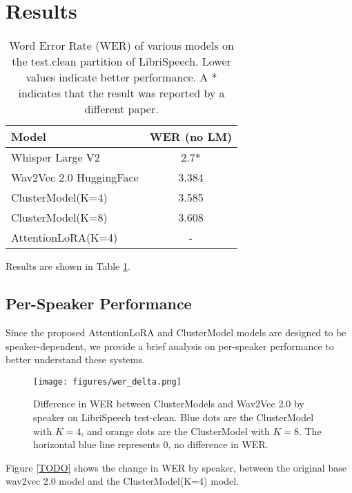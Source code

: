 \section{Results}

\begin{table}[htbp]
  \centering
  \begin{tabular}{lc}
    \toprule
    \textbf{Model} &WER (no LM)\\
    \midrule
    Whisper Large V2 \cite{whisperv2} &2.7* \\
    \midrule
    Wav2Vec 2.0 \cite{wav2vec2} HuggingFace &3.384 \\
    ClusterModel(K=4) & 3.585 \\
    ClusterModel(K=8) & 3.608 \\
    AttentionLoRA(K=4) & - \\
    \bottomrule
  \end{tabular}
  \caption{Word Error Rate (WER) of various models on the test.clean partition of LibriSpeech. Lower values indicate better performance. A * indicates that the result was reported by a different paper.}
  \label{tab:video_descriptor_comparison}
\end{table}

Results are shown in Table \ref{tab:video_descriptor_comparison}.

\subsection{Per-Speaker Performance}

Since the proposed AttentionLoRA and ClusterModel models are designed to be speaker-dependent,
we provide a brief analysis on per-speaker performance to better understand these systems.

\begin{figure}[h]
      \centering
      \texttt{[image: figures/wer\_delta.png]}
      \caption{Difference in WER between ClusterModels and Wav2Vec 2.0 by speaker on LibriSpeech test-clean.
        Blue dots are the ClusterModel with $K=4$, and orange dots are the ClusterModel with $K=8$.
      The horizontal blue line represents 0, no difference in WER.}
      \label{fig:wer_delta}
\end{figure}


Figure \ref{TODO} shows the change in WER by speaker, between the original base wav2vec 2.0 model and the ClusterModel(K=4) model.

